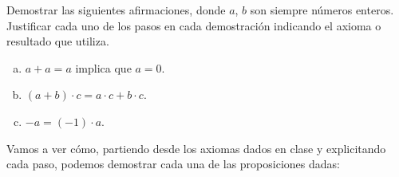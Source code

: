 \begin{problem}{}{}

    Demostrar las siguientes afirmaciones, donde $a$, $b$ son siempre números enteros.
    Justificar cada uno de los pasos en cada demostración indicando el axioma o resultado que utiliza.

    \begin{enumerate}[(a)]
        \item $a + a = a$ implica que $a = 0$.
        \item $(a + b) \cdot c = a \cdot c + b \cdot c$.
        \item $-a = (-1) \cdot a$.
    \end{enumerate}

\end{problem}
\vspace{1ex}

Vamos a ver cómo, partiendo desde los axiomas dados en clase y explicitando cada paso, podemos demostrar cada una de las proposiciones dadas:

